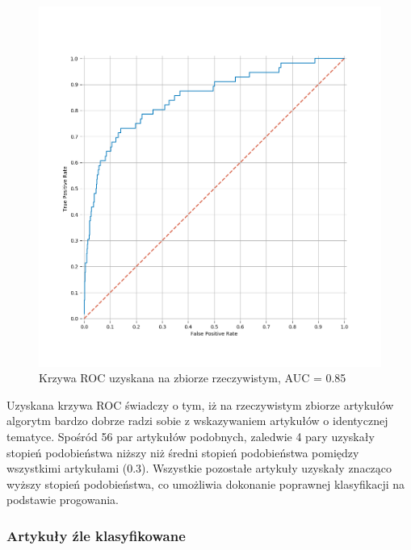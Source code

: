\begin{figure}[H]
\centering
\includegraphics[width=1.0\textwidth]{./pict/roc_identical.png}
\caption{Krzywa ROC uzyskana na zbiorze rzeczywistym, AUC = 0.85}
\label{fig:rocidentical}
\end{figure}

Uzyskana krzywa ROC świadczy o tym, iż na rzeczywistym zbiorze artykułów algorytm bardzo dobrze radzi sobie z wskazywaniem artykułów o identycznej tematyce. Spośród 56 par artykułów podobnych, zaledwie 4 pary uzyskały stopień podobieństwa niższy niż średni stopień podobieństwa pomiędzy wszystkimi artykułami (0.3). Wszystkie pozostałe artykuły uzyskały znacząco wyższy stopień podobieństwa, co umożliwia dokonanie poprawnej klasyfikacji na podstawie progowania. 

\subsubsection*{Artykuły źle klasyfikowane}

